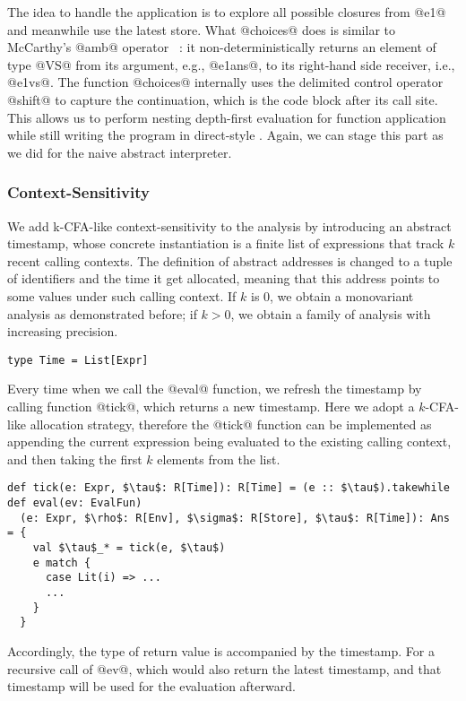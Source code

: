 The idea to handle the application is to explore all possible closures from @e1@
and meanwhile use the latest store. What @choices@ does is similar to McCarthy's
@amb@ operator ~\cite{MCCARTHY196333}: it non-deterministically returns an
element of type @VS@ from its argument, e.g., @e1ans@, to its right-hand side
receiver, i.e., @e1vs@. The function @choices@ internally uses the delimited
control operator @shift@ to capture the continuation, which is the code block
after its call site. This allows us to perform nesting depth-first evaluation
for function application while still writing the program in direct-style
\cite{Wei:2018:RAA:3243631.3236800}. Again, we can stage this part as we did for
the naive abstract interpreter.

\subsubsection{Context-Sensitivity}

We add k-CFA-like context-sensitivity to the analysis by introducing an abstract
timestamp, whose concrete instantiation is a finite list of expressions that
track $k$ recent calling contexts. The definition of abstract addresses is
changed to a tuple of identifiers and the time it get allocated, meaning that
this address points to some values under such calling context. If $k$ is 0, we
obtain a monovariant analysis as demonstrated before; if $k > 0$, we obtain a
family of analysis with increasing precision.

\begin{lstlisting}
type Time = List[Expr]
\end{lstlisting}

Every time when we call the @eval@ function, we refresh the timestamp by calling
function @tick@, which returns a new timestamp. Here we adopt a $k$-CFA-like
allocation strategy, therefore the @tick@ function can be implemented as
appending the current expression being evaluated to the existing calling
context, and then taking the first $k$ elements from the list.

\begin{lstlisting}
def tick(e: Expr, $\tau$: R[Time]): R[Time] = (e :: $\tau$).takewhile
def eval(ev: EvalFun)
  (e: Expr, $\rho$: R[Env], $\sigma$: R[Store], $\tau$: R[Time]): Ans = {
    val $\tau$_* = tick(e, $\tau$)
    e match {
      case Lit(i) => ...
      ...
    }
  }
\end{lstlisting}

Accordingly, the type of return value is accompanied by the timestamp. For a
recursive call of @ev@, which would also return the latest timestamp, and that
timestamp will be used for the evaluation afterward.

